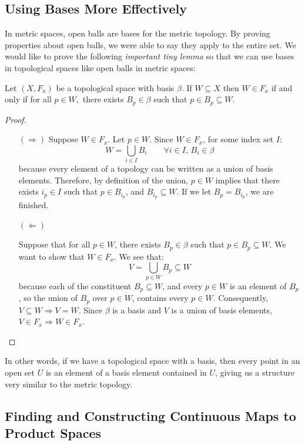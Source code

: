 \subsection{Using Bases More Effectively}

In metric spaces, open balls are bases for the metric topology. By proving properties about open balls, we were able to say they apply to the entire set. We would like to prove the following \emph{important tiny lemma} so that we can use bases in topological spaces like open balls in metric spaces: 
\begin{lemma}
	Let $(X,F_x)$ be a topological space with basis $\beta$. If $W\subseteq X$ then $W\in F_x$ if and only if for all $p\in W,$ there exists $B_p\in\beta$ such that $p\in B_p\subseteq W$. 
\end{lemma}
\begin{proof}
	\begin{itemize}
		\item[$(\Rightarrow)$] Suppose $W\in F_x$. Let $p\in W$. Since $W\in F_x$, for some index set $I$:
		\[W = \bigcup_{i\in I}B_i \qquad \forall i\in I,\,B_i\in \beta\]
		because every element of a topology can be written as a union of basis elements. Therefore, by definition of the union, $p\in W$ implies that there exists $i_p\in I$ such that $p\in B_{i_p}$, and $B_{i_p}\subseteq W$. If we let $B_p = B_{i_p}$, we are finished.
		
		\item[$(\Leftarrow)$]
		
		Suppose that for all $p\in W$, there exists $B_p\in \beta$ such that $p\in B_p\subseteq W$. We want to show that $W\in F_x$. We see that:
		\[V = \bigcup_{p\in W}B_p\subseteq W\]
		because each of the constituent $B_p\subseteq W$, and every $p\in W$ is an element of $B_p$, so the union of $B_p$ over $p\in W$, contains every $p\in W$. Consequently, $V\subseteq W \Rightarrow V=W$. Since $\beta$ is a basis and $V$ is a union of basis elements, $V\in F_x \Rightarrow W\in F_x$. 
	\end{itemize}
\end{proof}

In other words, if we have a topological space with a basis, then every point in an open set $U$ is an element of a basis element contained in $U$, giving us a structure very similar to the metric topology.

\subsection{Finding and Constructing Continuous Maps to Product Spaces}

